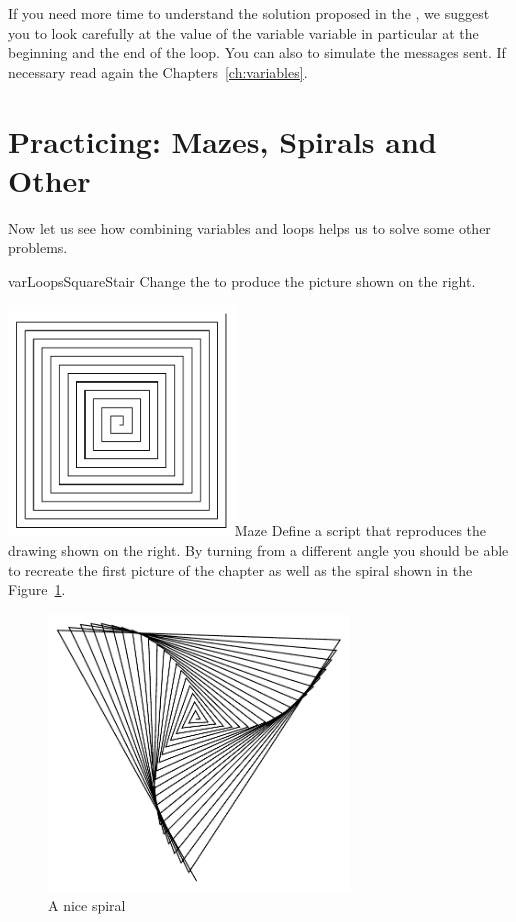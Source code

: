 If you need more time to understand the solution proposed in the
, we suggest you to look carefully at the value of the variable  variable  in particular at the beginning and the end of the loop. You can also to simulate the messages sent. If necessary read again the Chapters~\ref{ch:variables}.



\section{Practicing: Mazes, Spirals and Other}
Now let us see how combining variables and loops helps us to solve
some other problems.
\begin{exofig}{varLoopsSquareStair}
Change the  to produce the picture shown on 
the right.
\end{exofig}


\begin{exofigwithsizeandtitle}[0.4]{\includegraphics[width=6cm]{varLoopsMaze}}{Maze}\label{exo:maze}
Define a script that reproduces the drawing shown on the right. By turning from a different angle you should be able to recreate the first picture of the chapter as well as the  spiral shown in the Figure~\ref{fig:spiral}.
\end{exofigwithsizeandtitle}

\begin{figure}
\begin{center}
\includegraphics[width=8cm]{varLoopsSpiral121}
\caption{A nice spiral\label{fig:spiral}}
\end{center}
\end{figure}

